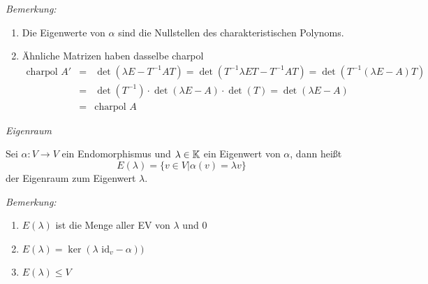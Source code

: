 \textit{Bemerkung:}
    \begin{enumerate}
        \item Die Eigenwerte von $\alpha$ sind die Nullstellen des charakteristischen Polynoms.
        \item Ähnliche Matrizen haben dasselbe charpol
            \begin{eqnarray*}
                \mbox{charpol }A' &=& \det(\lambda E-T^{-1}AT) = \det(T^{-1}\lambda ET-T^{-1}AT)=\det(T^{-1}(\lambda E-A)T)\\
                &=& \det(T^{-1}) \cdot \det(\lambda E-A) \cdot \det(T) = \det(\lambda E-A)\\
                &=& \mbox{charpol }A
            \end{eqnarray*}
    \end{enumerate}

\begin{mydef}\label{eigenraum} \textit{Eigenraum} \par
    Sei $\alpha:V\to V$ ein Endomorphismus und $\lambda \in \mathbb{K}$ ein Eigenwert von $\alpha$, dann heißt
    \begin{equation*}
        E(\lambda) = \lbrace v\in V | \alpha(v)=\lambda v \rbrace
    \end{equation*}
    der Eigenraum zum Eigenwert $\lambda$.
\end{mydef}

\textit{Bemerkung:}
    \begin{enumerate}
        \item $E(\lambda)$ ist die Menge aller EV von $\lambda$ und $0$
        \item $E(\lambda) = \ker(\lambda\mbox{ id}_v-\alpha) )$
        \item $E(\lambda)\leq V$
    \end{enumerate}


